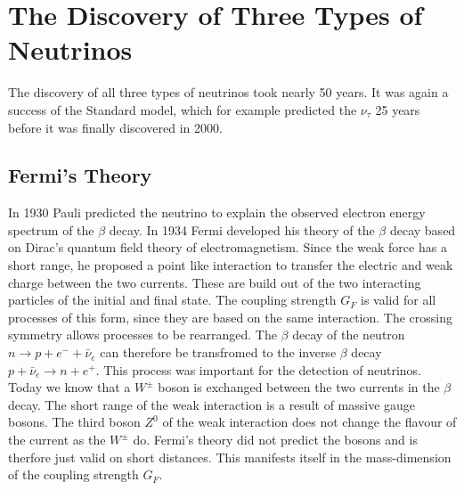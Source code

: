 \section{The Discovery of Three Types of Neutrinos \cite{neutrino}}
The discovery of all three types of neutrinos took nearly 50 years. It was again a success of the Standard model, which for example predicted the $\nu_{\tau}$ 25 years before it was finally discovered in 2000.

\subsection{Fermi's Theory}
In 1930 Pauli predicted the neutrino to explain the observed electron energy spectrum of the $\beta$ decay. In 1934 Fermi developed his theory of the $\beta$ decay based on Dirac's quantum field theory of electromagnetism. Since the weak force has a short range, he proposed a point like interaction to transfer the electric and weak charge between the two currents. These are build out of the two interacting particles of the initial and final state. The coupling strength $G_F$ is valid for all processes of this form, since they are based on the same interaction. The crossing symmetry allows processes to be rearranged. The $\beta$ decay of the neutron $n \rightarrow p + e^- + \bar{\nu}_e$ can therefore be transfromed to the inverse $\beta$ decay $p + \bar{\nu}_e \rightarrow n + e^+$. This process was important for the detection of neutrinos.\\
Today we know that a $W^{\pm}$ boson is exchanged between the two currents in the $\beta$ decay. The short range of the weak interaction is a result of massive gauge bosons. The third boson $Z^0$ of the weak interaction does not change the flavour of the current as the $W^{\pm}$ do. Fermi's theory did not predict the bosons and is therfore just valid on short distances. This manifests itself in the mass-dimension of the coupling strength $G_F$.

